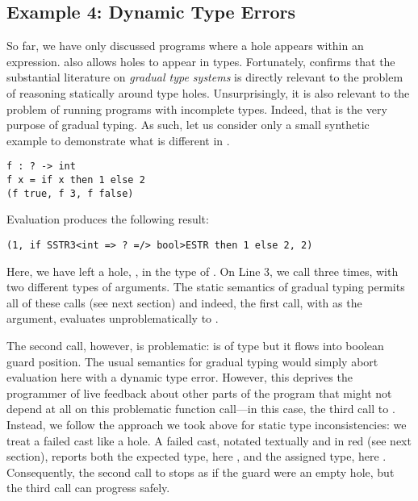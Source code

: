 
\vspace{-4px}
\subsection{Example 4: Dynamic Type Errors}
\label{sec:dynamic-type-errors}
\vspace{-2px}
So far, we have only discussed programs where a hole appears within an expression.
\Hazel also allows holes to appear in types.
Fortunately, \citet{popl-paper} confirms that the substantial literature on \emph{gradual type systems} \cite{Siek06a,DBLP:conf/snapl/SiekVCB15} is directly relevant to the problem of reasoning statically around type holes.
Unsurprisingly, it is also relevant to the problem of running 
programs with incomplete types. Indeed, that is the very purpose of gradual typing. As such, let us consider only a small synthetic example to demonstrate what is different in \Hazel.
\begin{lstlisting}
f : ? -> int
f x = if x then 1 else 2
(f true, f 3, f false)
\end{lstlisting}
Evaluation produces the following result:
\begin{lstlisting}[numbers=none]
(1, if SSTR3<int => ? =/> bool>ESTR then 1 else 2, 2)
\end{lstlisting}
Here, we have left a hole, , in the type of . On Line 3, we call  three times, with two different types of arguments. The static semantics of gradual typing permits all of these calls (see next section) and indeed, the first call, with  as the argument, evaluates unproblematically to . 

The second call, however, is problematic:  is of type  but it flows into boolean guard position. The usual semantics for gradual typing would simply abort evaluation here with a dynamic type error. However, this deprives the programmer of live feedback about other parts of the program that might not depend at all on this problematic function call---in this case, the third call to . Instead, we follow the approach we took above for static type inconsistencies: we treat a failed cast like a hole. A failed cast, notated textually and in red  (see next section), reports both the expected type, here , and the assigned type, here . Consequently, the second call to  stops as if the guard were an empty hole, but the third call can progress safely.



